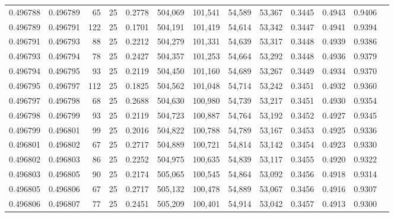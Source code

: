 \begin{tabular}{rrrrrrrrrrrrr}
0.496788 & 0.496789 &    65 &  25 &                                     0.2778 & 504,069 & 101,541 &  54,589 &  53,367 & 0.3445 & 0.4943 & 0.9406 \\
0.496789 & 0.496791 &   122 &  25 &                                     0.1701 & 504,191 & 101,419 &  54,614 &  53,342 & 0.3447 & 0.4941 & 0.9394 \\
0.496791 & 0.496793 &    88 &  25 &                                     0.2212 & 504,279 & 101,331 &  54,639 &  53,317 & 0.3448 & 0.4939 & 0.9386 \\
0.496793 & 0.496794 &    78 &  25 &                                     0.2427 & 504,357 & 101,253 &  54,664 &  53,292 & 0.3448 & 0.4936 & 0.9379 \\
0.496794 & 0.496795 &    93 &  25 &                                     0.2119 & 504,450 & 101,160 &  54,689 &  53,267 & 0.3449 & 0.4934 & 0.9370 \\
0.496795 & 0.496797 &   112 &  25 &                                     0.1825 & 504,562 & 101,048 &  54,714 &  53,242 & 0.3451 & 0.4932 & 0.9360 \\
0.496797 & 0.496798 &    68 &  25 &                                     0.2688 & 504,630 & 100,980 &  54,739 &  53,217 & 0.3451 & 0.4930 & 0.9354 \\
0.496798 & 0.496799 &    93 &  25 &                                     0.2119 & 504,723 & 100,887 &  54,764 &  53,192 & 0.3452 & 0.4927 & 0.9345 \\
0.496799 & 0.496801 &    99 &  25 &                                     0.2016 & 504,822 & 100,788 &  54,789 &  53,167 & 0.3453 & 0.4925 & 0.9336 \\
0.496801 & 0.496802 &    67 &  25 &                                     0.2717 & 504,889 & 100,721 &  54,814 &  53,142 & 0.3454 & 0.4923 & 0.9330 \\
0.496802 & 0.496803 &    86 &  25 &                                     0.2252 & 504,975 & 100,635 &  54,839 &  53,117 & 0.3455 & 0.4920 & 0.9322 \\
0.496803 & 0.496805 &    90 &  25 &                                     0.2174 & 505,065 & 100,545 &  54,864 &  53,092 & 0.3456 & 0.4918 & 0.9314 \\
0.496805 & 0.496806 &    67 &  25 &                                     0.2717 & 505,132 & 100,478 &  54,889 &  53,067 & 0.3456 & 0.4916 & 0.9307 \\
0.496806 & 0.496807 &    77 &  25 &                                     0.2451 & 505,209 & 100,401 &  54,914 &  53,042 & 0.3457 & 0.4913 & 0.9300 \\

\end{tabular}
